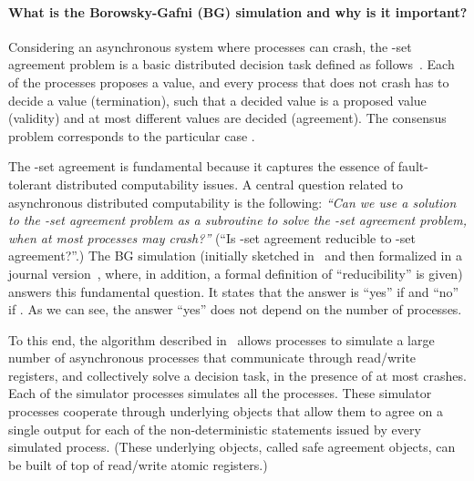\documentclass[11pt,letterpaper]{article}
\begin{document}
\paragraph{What is the Borowsky-Gafni (BG) simulation and why is it important?}
Considering an asynchronous system where processes can crash, the -set
agreement problem is a basic distributed decision task defined as
follows~\cite{C93}.
Each of  the  processes  proposes a value,  and every process  that does
not crash has  to decide a value (termination), such  that a decided value
is a proposed value (validity) and at most  different values are decided
(agreement). The consensus problem corresponds to the particular case .

The -set agreement is fundamental because it captures the essence 
of fault-tolerant distributed computability issues. 
A central  question related to asynchronous distributed computability is
the following: 
{\sl ``Can we use a  solution to the -set
agreement problem as a subroutine to solve the  -set
agreement problem, when at most  processes may crash?''}
(``Is -set agreement  reducible to -set agreement?''.)
The BG simulation (initially sketched in~\cite{BG93}
and then formalized  in a journal version~\cite{BGLR01},
 where, in addition, a formal definition of ``reducibility'' is given) 
answers this  fundamental question.
It states that the answer is ``yes'' if  and  ``no'' if
. As we can see, the answer ``yes'' does not depend on
the number of processes.


To this end, the algorithm described in~\cite{BGLR01} allows 
processes  to simulate a large number  of asynchronous processes that
communicate through  read/write registers, and collectively solve a decision
task, in the presence of at most  crashes.
Each of the   simulator processes simulates all the  processes.
These  simulator processes cooperate through underlying objects
that allow them to agree on a single output for each  of the non-deterministic
statements  issued by every simulated process. (These underlying objects,
called safe agreement objects, can be built of top of read/write atomic
registers.)
\end{document}
